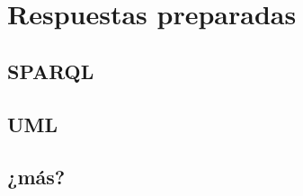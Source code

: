 \documentclass[spanish,notes=hide]{beamer}
\begin{document}
\appendix

\section{Respuestas preparadas}

\subsection{SPARQL}
\frame{
\begin{center}
  \SPARQL
\end{center}
}

\subsection{UML}

\subsection{¿más?}
\end{document}

